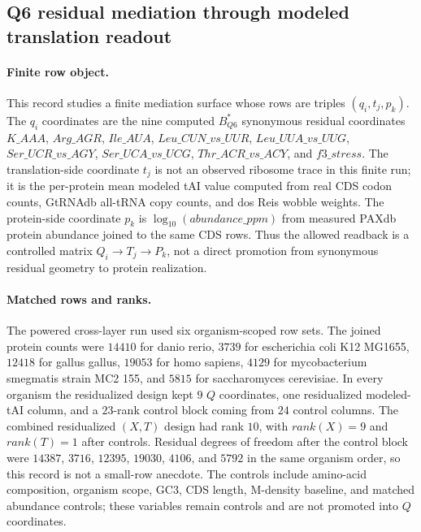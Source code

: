 \subsection{Q6 residual mediation through modeled translation readout}\label{sec:q6-translation-mediated-protein-abundance-cross-layer}

\paragraph{Finite row object.} This record studies a finite mediation surface whose rows are triples $(q_i,t_j,p_k)$.  The $q_i$ coordinates are the nine computed $B^{*}_{Q6}$ synonymous residual coordinates $K\_AAA$, $Arg\_AGR$, $Ile\_AUA$, $Leu\_CUN\_vs\_UUR$, $Leu\_UUA\_vs\_UUG$, $Ser\_UCR\_vs\_AGY$, $Ser\_UCA\_vs\_UCG$, $Thr\_ACR\_vs\_ACY$, and $f3\_stress$.  The translation-side coordinate $t_j$ is not an observed ribosome trace in this finite run; it is the per-protein mean modeled tAI value computed from real CDS codon counts, GtRNAdb all-tRNA copy counts, and dos Reis wobble weights.  The protein-side coordinate $p_k$ is $\log_{10}(abundance\_ppm)$ from measured PAXdb protein abundance joined to the same CDS rows.  Thus the allowed readback is a controlled matrix $Q_i \to T_j \to P_k$, not a direct promotion from synonymous residual geometry to protein realization.

\paragraph{Matched rows and ranks.} The powered cross-layer run used six organism-scoped row sets.  The joined protein counts were $14410$ for danio rerio, $3739$ for escherichia coli K12 MG1655, $12418$ for gallus gallus, $19053$ for homo sapiens, $4129$ for mycobacterium smegmatis strain MC2 155, and $5815$ for saccharomyces cerevisiae.  In every organism the residualized design kept $9$ $Q$ coordinates, one residualized modeled-tAI column, and a $23$-rank control block coming from $24$ control columns.  The combined residualized $(X,T)$ design had rank $10$, with $rank(X)=9$ and $rank(T)=1$ after controls.  Residual degrees of freedom after the control block were $14387$, $3716$, $12395$, $19030$, $4106$, and $5792$ in the same organism order, so this record is not a small-row anecdote.  The controls include amino-acid composition, organism scope, GC3, CDS length, M-density baseline, and matched abundance controls; these variables remain controls and are not promoted into $Q$ coordinates.

